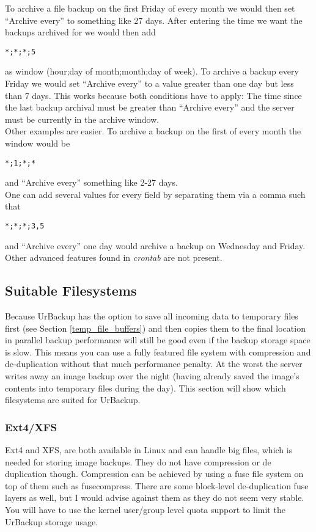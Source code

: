 \documentclass[a4paper,10pt]{article}
\begin{document}
\noindent To archive a file backup on the first Friday of every month we would
then set ``Archive every'' to something like 27 days. After entering the time we
want the backups archived for we would then add
\begin{verbatim}
*;*;*;5
\end{verbatim}
as window (hour;day of month;month;day of week).
To archive a backup every Friday we would set ``Archive every'' to a value
greater than one day but less than 7 days. This works because both conditions have to
apply: The time since the last backup archival must be greater than ``Archive every'' and
the server must be currently in the archive window.\\
Other examples are easier. To archive a backup on the first of every month the window
would be
\begin{verbatim}
*;1;*;*
\end{verbatim}
and ``Archive every'' something like 2-27 days.\\
One can add several values for every field by separating them via a comma such that
\begin{verbatim}
*;*;*;3,5
\end{verbatim}
and ``Archive every'' one day would archive a backup on Wednesday and Friday. Other
advanced features found in \textsl{crontab} are not present. 

\subsection{Suitable Filesystems}
\label{subsec_filesystems}

Because UrBackup has the option to save all incoming data to temporary files first
(see Section \ref{temp_file_buffers})
and then copies them to the final location in parallel backup performance will
still be good even if the backup storage space is slow. This means you can use a
fully featured file system with compression and de-duplication without that
much performance penalty. At the worst the server writes away an image backup over
the night (having already saved the image's contents into temporary files during the day).
This section will show which filesystems are suited for UrBackup.

\subsubsection{Ext4/XFS}

Ext4 and XFS, are both available in Linux and can handle big files, which is needed for storing image backups. They do not have compression or de duplication though. Compression can be achieved by using a fuse file system on top of them such as fusecompress. There are some block-level de-duplication fuse layers as well, but I would advise against them as they do not seem very stable. You will have to use the kernel user/group level quota support to limit the UrBackup storage usage.
\end{document}
